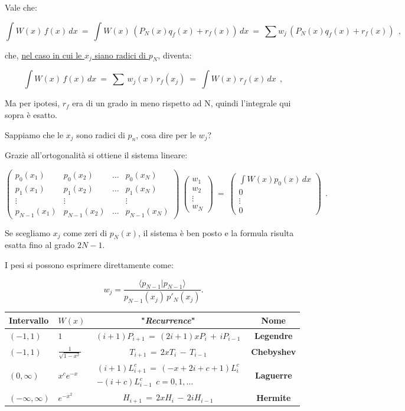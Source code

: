 \documentclass{article}
\begin{document}
	Vale che:
	
	\[ \int W(x)\,f(x)\,dx\ =\ \int W(x)\, (P_N(x)q_f(x) + r_f(x))\, dx\ =\ \sum w_j\, (P_N(x)q_f(x) + r_f(x))\ \ , \]
	
	che, \underline{nel caso in cui le $x_j$ siano radici di $p_N$}, diventa:
	
	\[ \int W(x)\,f(x)\,dx\ =\  \sum\, w_j(x)\, r_f(x_j) \ =\ \int W(x)\, r_f(x)\, dx\ \ , \]
	
	Ma per ipotesi, $r_f$ era di un grado in meno rispetto ad N, quindi l'integrale qui sopra è esatto.
	
	Sappiamo che le $x_j$ sono radici di $p_n$, cosa dire per le $w_j$?  
	
	Grazie all'ortogonalità si ottiene il sistema lineare:
	
	\[ \begin{pmatrix}
		p_0(x_1) & p_0(x_2) & \dots & p_0(x_N) \\
		p_1(x_1) & p_1(x_2) & \dots & p_1(x_N) \\
		\vdots   & \vdots   &       & \vdots   \\
		p_{N-1}(x_1) & p_{N-1}(x_2) & \dots & p_{N-1}(x_N)
	\end{pmatrix}\
	\begin{pmatrix}
		w_1 \\ w_2 \\ \vdots \\ w_N
	\end{pmatrix}
	\ =\
	\begin{pmatrix}
		\int W(x)p_0(x)\,dx \\
		0 \\
		\vdots \\
		0
	\end{pmatrix}\ \ .\]
	
	Se scegliamo $x_j$ come zeri di $p_N(x)$, il sistema è ben posto e la formula risulta esatta fino al grado $2N-1$.
	
	I pesi si possono esprimere direttamente come:
	
	\[
	w_j
	=
	\frac{\langle p_{N-1}|p_{N-1}\rangle}
	{p_{N-1}(x_j)\, p'_N(x_j)}.
	\]
	
	
	\begin{center}
		\begin{tabular}{|l|l|c|c|}
			\hline
			Intervallo & $W(x)$ & "\emph{Recurrence}" & Nome \\
			\hline
			$(-1,1)$ & $1$ & $(i+1)P_{i+1}\,=\,(2i+1)xP_i\, +\, iP_{i-1}$ & \textbf{Legendre} \\
			$(-1,1)$ & $\displaystyle\frac{1}{\sqrt{1-x^2}}$ & $T_{i+1}\, =\, 2xT_i\,- \,T_{i-1}$ & \textbf{Chebyshev} \\
			$(0,\infty)$ & $x^c e^{-x}$ & $\begin{aligned} (i+1)L^c_{i+1}\,=\, (-x+2i+c+1) L^c_i \\ -(i+c)L^c_{i-1}\ \ c=0,1,\dots \end{aligned}$ &\textbf{Laguerre} \\
			$(-\infty,\infty)$ & $e^{-x^2}$ & $H_{i+1}\,=\, 2xH_i\,-\,2iH_{i-1}$ &\textbf{Hermite} \\
			\hline
		\end{tabular}
	\end{center}
	
\end{document}

